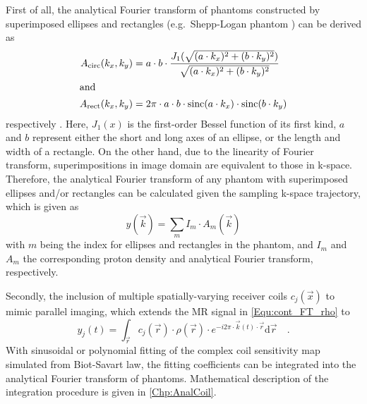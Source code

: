 First of all, the analytical Fourier transform of phantoms constructed by superimposed ellipses and rectangles (e.g.~Shepp-Logan phantom \cite{1974_SL,2008_SL_Gach}) can be derived as
\begin{align} 
  A_{\text{circ}}(k_x,k_y) &= a \cdot b \cdot \frac{J_1(\sqrt{(a \cdot k_x)^2 + (b \cdot k_y)^2})}{\sqrt{(a \cdot k_x)^2 + (b \cdot k_y)^2}} \label{Equ:aFT_circ} \\
\intertext{and}
  A_{\text{rect}}(k_x,k_y) &= 2\pi \cdot a \cdot b \cdot \operatorname{sinc}(a \cdot k_x) \cdot \operatorname{sinc}(b \cdot k_y) \label{Equ:aFT_rect}
\end{align}
respectively \cite{2008_Block_Thesis}. Here, $J_1(x)$ is the first-order Bessel function of its first kind, $a$ and $b$ represent either the short and long axes of an ellipse, or the length and width of a rectangle. On the other hand, due to the linearity of Fourier transform, superimpositions in image domain are equivalent to those in k-space. Therefore, the analytical Fourier transform of any phantom with superimposed ellipses and/or rectangles can be calculated given the sampling k-space trajectory, which is given as
\begin{equation} \label{Equ:sum_aFT_rho}
  y(\vec{k}) = \sum_{m} I_m \cdot A_m(\vec{k})
\end{equation}
with $m$ being the index for ellipses and rectangles in the phantom, and $I_m$ and $A_m$ the corresponding proton density and analytical Fourier transform, respectively.

Secondly, the inclusion of multiple spatially-varying receiver coils $c_j(\vec{x})$ to mimic parallel imaging, which extends the MR signal in \cref{Equ:cont_FT_rho} to 
\begin{equation} \label{Equ:cont_FT_rho_coil}
  y_j(t) = \int_{\vec{r}} c_j(\vec{r}) \cdot \rho(\vec{r}) \cdot e^{-i 2\pi \cdot \vec{k}(t) \cdot \vec{r}} \text{d} \vec{r} \quad .
\end{equation}
With sinusoidal or polynomial fitting of the complex coil sensitivity map simulated from Biot-Savart law, the fitting coefficients can be integrated into the analytical Fourier transform of phantoms. Mathematical description of the integration procedure is given in \cref{Chp:AnalCoil}.

